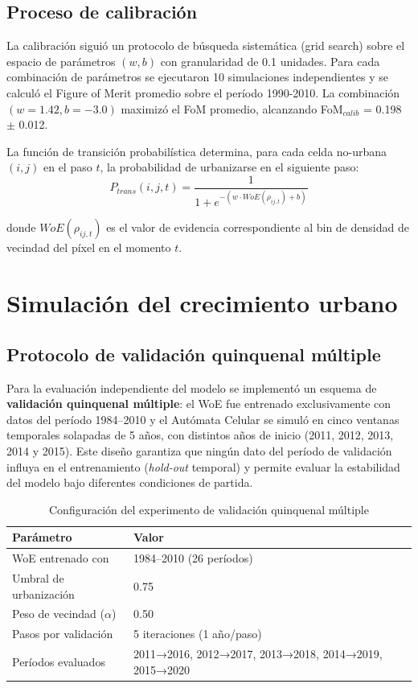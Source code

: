 \subsection{Proceso de calibración}

La calibración siguió un protocolo de búsqueda sistemática (grid search) sobre el espacio de parámetros $(w, b)$ con granularidad de 0.1 unidades. Para cada combinación de parámetros se ejecutaron 10 simulaciones independientes y se calculó el Figure of Merit promedio sobre el período 1990-2010. La combinación $(w=1.42, b=-3.0)$ maximizó el FoM promedio, alcanzando FoM$_{calib}$ = 0.198 $\pm$ 0.012.

La función de transición probabilística determina, para cada celda no-urbana $(i,j)$ en el paso $t$, la probabilidad de urbanizarse en el siguiente paso:
\begin{equation}
P_{trans}(i,j,t) = \frac{1}{1 + e^{-(w \cdot WoE(\rho_{ij,t}) + b)}}
\end{equation}

donde $WoE(\rho_{ij,t})$ es el valor de evidencia correspondiente al bin de densidad de vecindad del píxel en el momento $t$.

\section{Simulación del crecimiento urbano}

\subsection{Protocolo de validación quinquenal múltiple}

Para la evaluación independiente del modelo se implementó un esquema de \textbf{validación quinquenal múltiple}: el WoE fue entrenado exclusivamente con datos del período 1984--2010 y el Autómata Celular se simuló en cinco ventanas temporales solapadas de 5 años, con distintos años de inicio (2011, 2012, 2013, 2014 y 2015). Este diseño garantiza que ningún dato del período de validación influya en el entrenamiento (\textit{hold-out} temporal) y permite evaluar la estabilidad del modelo bajo diferentes condiciones de partida.

\begin{table}[htbp]
\centering
\caption{Configuración del experimento de validación quinquenal múltiple}
\label{tab:simulation_config}
\begin{tabular}{ll}
\toprule
\textbf{Parámetro} & \textbf{Valor} \\
\midrule
WoE entrenado con & 1984--2010 (26 períodos) \\
Umbral de urbanización & 0.75 \\
Peso de vecindad ($\alpha$) & 0.50 \\
Pasos por validación & 5 iteraciones (1 año/paso) \\
Períodos evaluados & 2011→2016, 2012→2017, 2013→2018, 2014→2019, 2015→2020 \\
\bottomrule
\end{tabular}
\end{table}

